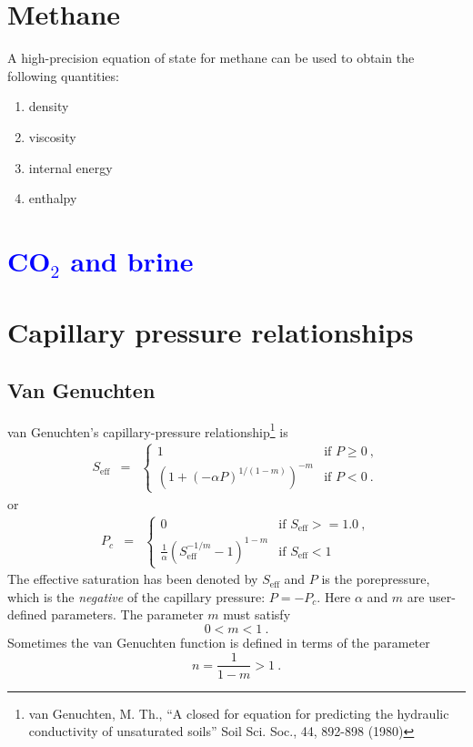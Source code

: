 \documentclass[12pt]{report}
\begin{document}
\section{Methane}

A high-precision equation of state for methane can be used to
obtain the following quantities:
\begin{enumerate}
\item density
\item viscosity
\item internal energy
\item enthalpy
\end{enumerate}

\section{\textcolor{blue}{CO$_{2}$ and brine}}

\section{Capillary pressure relationships}
\label{pc.sec}

\subsection{Van Genuchten}

van Genuchten's capillary-pressure relationship\footnote{van
  Genuchten, M. Th., ``A closed for equation for predicting the
  hydraulic conductivity of unsaturated soils'' Soil Sci. Soc., 44,
  892-898 (1980)} is
\begin{eqnarray}
S_{\mathrm{eff}} & = & \left\{
\begin{array}{ll}
1 & \mbox{if } P \geq 0 \ , \\
(1 + (-\alpha P)^{1/(1-m)})^{-m} & \mbox{if } P < 0\ .
\label{vg.cap.eqn}
\end{array}
\right.
\end{eqnarray}
or
\begin{eqnarray}
P_{c} & = & \left\{
\begin{array}{ll}
0 & \mbox{if } S_{\mathrm{eff}} >= 1.0 \ , \\
\frac{1}{\alpha} (S_{\mathrm{eff}}^{-1/m} - 1)^{1 - m} & \mbox{if }
S_{\mathrm{eff}} < 1
\end{array}
\right.
\end{eqnarray}
The effective saturation has been denoted by $S_{\mathrm{eff}}$ and
$P$ is the porepressure, which is the {\em negative} of the capillary
pressure: $P = -P_{c}$.  Here $\alpha$ and $m$ are user-defined parameters.  The
parameter $m$ must satisfy
\begin{equation}
0 < m < 1 \ .
\end{equation}
Sometimes the van
Genuchten function is defined in terms of the parameter
\begin{equation}
n = \frac{1}{1 - m} > 1 \ .
\end{equation}
\end{document}
